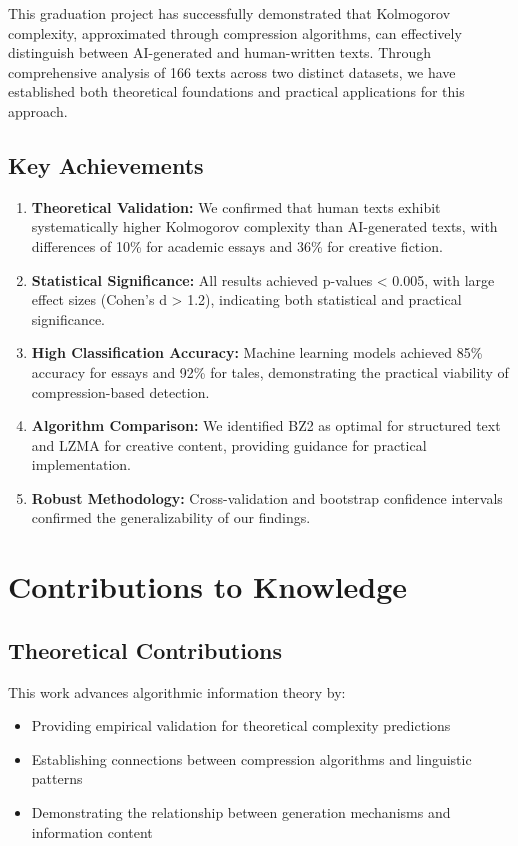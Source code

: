 \documentclass[12pt,a4paper]{report}
\begin{document}
This graduation project has successfully demonstrated that Kolmogorov complexity, approximated through compression algorithms, can effectively distinguish between AI-generated and human-written texts. Through comprehensive analysis of 166 texts across two distinct datasets, we have established both theoretical foundations and practical applications for this approach.

\subsection{Key Achievements}

\begin{enumerate}
    \item \textbf{Theoretical Validation:} We confirmed that human texts exhibit systematically higher Kolmogorov complexity than AI-generated texts, with differences of 10\% for academic essays and 36\% for creative fiction.

    \item \textbf{Statistical Significance:} All results achieved p-values < 0.005, with large effect sizes (Cohen's d > 1.2), indicating both statistical and practical significance.

    \item \textbf{High Classification Accuracy:} Machine learning models achieved 85\% accuracy for essays and 92\% for tales, demonstrating the practical viability of compression-based detection.

    \item \textbf{Algorithm Comparison:} We identified BZ2 as optimal for structured text and LZMA for creative content, providing guidance for practical implementation.

    \item \textbf{Robust Methodology:} Cross-validation and bootstrap confidence intervals confirmed the generalizability of our findings.
\end{enumerate}

\section{Contributions to Knowledge}

\subsection{Theoretical Contributions}

This work advances algorithmic information theory by:
\begin{itemize}
    \item Providing empirical validation for theoretical complexity predictions
    \item Establishing connections between compression algorithms and linguistic patterns
    \item Demonstrating the relationship between generation mechanisms and information content
\end{itemize}
\end{document}
